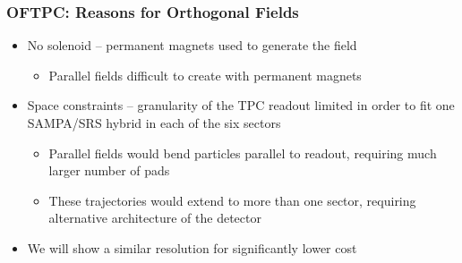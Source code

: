\documentclass{beamer}
\begin{document}
	\begin{frame}
		\frametitle{OFTPC: Reasons for Orthogonal Fields}
		\begin{itemize}
			\item No solenoid -- permanent magnets used to generate the field
			\begin{itemize}
				\item Parallel fields difficult to create with permanent magnets
			\end{itemize}
			\item Space constraints -- granularity of the TPC readout limited in order to fit one SAMPA/SRS hybrid in each of the six sectors
			\begin{itemize}
				\item Parallel fields would bend particles parallel to readout, requiring much larger number of pads
				\item These trajectories would extend to more than one sector, requiring alternative architecture of the detector
			\end{itemize}
			\item We will show a similar resolution for significantly lower cost
		\end{itemize}
	\end{frame}
	
\end{document}
